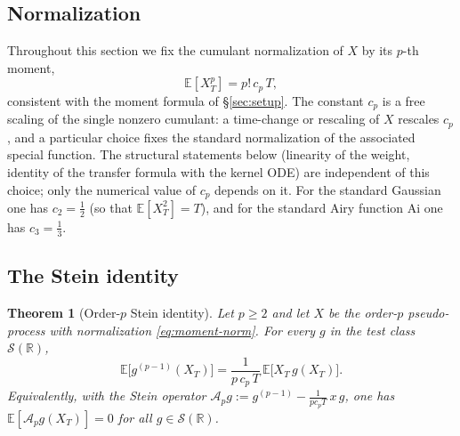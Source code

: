 \documentclass[11pt,reqno]{amsart}
\theoremstyle{plain}
\newtheorem{theorem}{Theorem}[section]
\theoremstyle{definition}
\newcommand{\E}{\mathbb{E}}
\newcommand{\R}{\mathbb{R}}
\newcommand{\Schw}{\mathcal{S}}
\begin{document}
\subsection{Normalization}

Throughout this section we fix the cumulant normalization of $X$ by its $p$-th moment,
\begin{equation}
\label{eq:moment-norm}
\E[X_T^{p}] = p!\, c_p\, T,
\end{equation}
consistent with the moment formula of \S\ref{sec:setup}. The constant $c_p$ is a free scaling of the single nonzero cumulant: a time-change or rescaling of $X$ rescales $c_p$, and a particular choice fixes the standard normalization of the associated special function. The structural statements below (linearity of the weight, identity of the transfer formula with the kernel ODE) are independent of this choice; only the numerical value of $c_p$ depends on it. For the standard Gaussian one has $c_2 = \tfrac12$ (so that $\E[X_T^2]=T$), and for the standard Airy function $\mathrm{Ai}$ one has $c_3 = \tfrac13$.

\subsection{The Stein identity}

\begin{theorem}[Order-$p$ Stein identity]
\label{thm:stein}
Let $p \geq 2$ and let $X$ be the order-$p$ pseudo-process with normalization \eqref{eq:moment-norm}. For every $g$ in the test class $\Schw(\R)$,
\begin{equation}
\label{eq:stein}
\E\bigl[g^{(p-1)}(X_T)\bigr] = \frac{1}{p\, c_p\, T}\,\E\bigl[X_T\, g(X_T)\bigr].
\end{equation}
Equivalently, with the Stein operator $\mathcal{A}_p g := g^{(p-1)} - \frac{1}{p c_p T}\, x\, g$, one has $\E[\mathcal{A}_p g (X_T)] = 0$ for all $g \in \Schw(\R)$.
\end{theorem}
\end{document}

